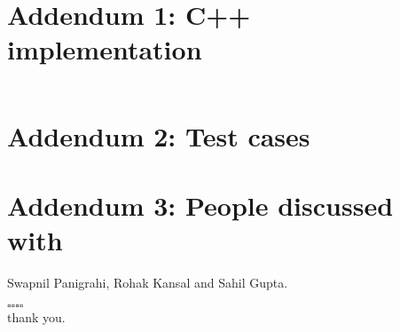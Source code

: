 \documentclass{article}
\begin{document}
\section*{Addendum 1: C++ implementation}

\inputminted{cpp}{stcut.cpp}

\section*{Addendum 2: Test cases}




\section*{Addendum 3: People discussed with}

Swapnil Panigrahi, Rohak Kansal and Sahil Gupta.


\vspace*{\fill}
\begin{center}
    $\square \square \square \square$
    \\
    thank you.
\end{center}
\vspace*{\fill}
\end{document}
